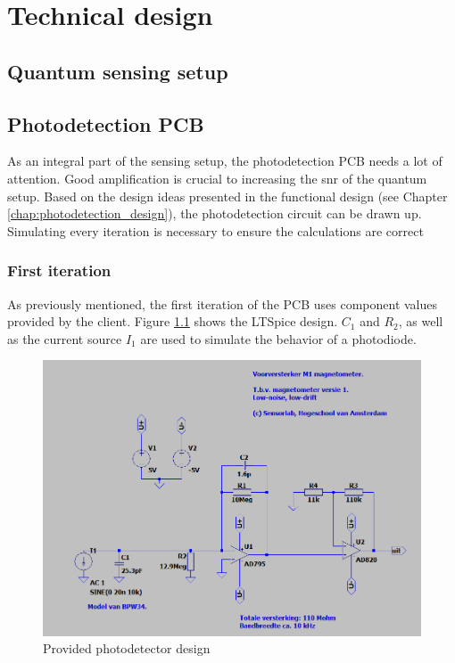 \chapter{Technical design} \label{chap:tech_design}
\section{Quantum sensing setup}
\section{Photodetection PCB}
As an integral part of the sensing setup, the photodetection PCB needs a lot of attention. Good amplification is crucial to increasing the \gls{snr} of the quantum setup. Based on the design ideas presented in the functional design (see Chapter \ref{chap:photodetection_design}), the photodetection circuit can be drawn up. Simulating every iteration is necessary to ensure the calculations are correct 

\subsection{First iteration}
As previously mentioned, the first iteration of the PCB uses component values provided by the client. Figure \ref{fig:photodetecog} shows the LTSpice design. $C_1$ and $R_2$, as well as the current source $I_1$ are used to simulate the behavior of a photodiode.

\begin{figure} [ht]
	\centering
	\includegraphics[width=0.7\linewidth]{img/photodetec_og}
	\caption{Provided photodetector design}
	\label{fig:photodetecog}
\end{figure}


